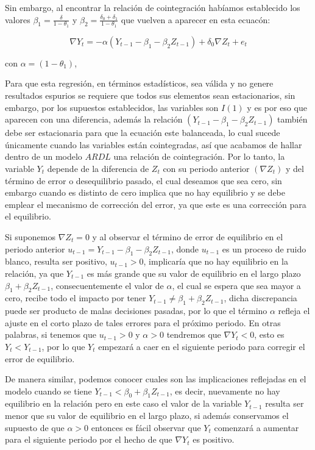 Sin embargo, al encontrar la relación de cointegración habíamos establecido los valores  $\beta_1=\frac{\delta}{1-\theta_1}$ y $\beta_2=\frac{\delta_0 + \delta_1}{1-\theta_1}$  que vuelven a aparecer en esta ecuacón:

 \begin{equation}\label{eq:rcoint}
\nabla Y_t = -\alpha \left (   Y_{t-1} - \beta_1  -\beta_2 Z_{t-1} \right ) + \delta_0 \nabla Z_t  + e_t   
\end{equation}
 
 con $\alpha=(1-\theta_1)$,\bigskip
 
 Para que esta regresión, en términos estadísticos, sea válida y no genere resultados espurios se requiere que todos sus elementos sean estacionarios, sin embargo, por los supuestos establecidos, las variables son $I(1)$ y es por eso que aparecen con una diferencia, además la relación  $\left (   Y_{t-1} - \beta_1  -\beta_2 Z_{t-1} \right )$ también debe ser estacionaria para que la ecuación este balanceada, lo cual sucede únicamente cuando las variables están cointegradas, así que acabamos de hallar dentro de un modelo $ARDL$ una relación de cointegración. Por lo tanto, la variable $Y_t$ depende de la diferencia de $Z_t$ con su periodo anterior $(\nabla Z_t )$ y del término de error o desequilibrio pasado, el cual deseamos que sea cero, sin embargo cuando es distinto de cero implica que no hay equilibrio y se debe emplear el mecanismo de corrección del error, ya que este es una corrección para el equilibrio.  \bigskip
 
 Si suponemos $ \nabla Z_t =0$  y al observar el término de error de equilibrio en el periodo anterior $u_{t-1}=Y_{t-1} - \beta_1  -\beta_2 Z_{t-1} $, donde $u_{t-1}$ es un proceso de ruido blanco, resulta ser positivo, $  u_{t-1}> 0$, implicaría  que no hay equilibrio en la relación, ya que $Y_{t-1}$ es más grande que su valor de equilibrio en el largo plazo $ \beta_1  + \beta_2 Z_{t-1}$, consecuentemente el valor de  $\alpha$, el cual se espera que sea mayor a cero, recibe todo el impacto por tener   $Y_{t-1} \neq  \beta_1  + \beta_2 Z_{t-1}$, dicha discrepancia puede ser producto de malas decisiones pasadas, por lo que el término $\alpha$ refleja el ajuste en el corto plazo de tales errores para el próximo periodo. En otras palabras, si tenemos que $u_{t-1}>0$ y $\alpha>0$   tendremos que $\nabla Y_t <0$, esto es $Y_t < Y_{t-1}$, por lo que $Y_t$ empezará a caer en el siguiente periodo para corregir el error de equilibrio.    \bigskip
 
De manera similar, podemos conocer cuales son las implicaciones reflejadas en el modelo cuando se tiene  $Y_{t-1}< \beta_0 + \beta_1 Z_{t-1}$, es decir, nuevamente no hay equilibrio en la relación pero en este caso el valor de la variable $Y_{t-1}$ resulta ser menor que su valor de equilibrio en el largo plazo, si además conservamos el supuesto de que $\alpha >0$ entonces es fácil observar que $Y_{t}$ comenzará a aumentar para el siguiente periodo por el hecho de que $\nabla Y_t$ es positivo.\bigskip

